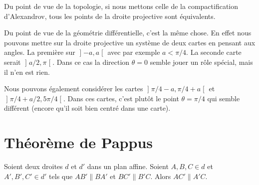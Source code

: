 \begin{remark}
	Du point de vue de la topologie, si nous mettons celle de la compactification d'Alexandrov, tous les points de la droite projective sont équivalents.

	Du point de vue de la géométrie différentielle, c'est la même chose. En effet nous pouvons mettre sur la droite projective un système de deux cartes en pensant aux angles. La première sur \( \mathopen] -a , a \mathclose[\) avec par exemple \( a<\pi/4\). La seconde carte serait \( \mathopen] a/2 , \pi \mathclose[\). Dans ce cas la direction \( \theta=0\) semble jouer un rôle spécial, mais il n'en est rien.

		Nous pouvons également considérer les cartes \( \mathopen] \pi/4-a , \pi/4+a \mathclose[\) et \( \mathopen] \pi/4+a/2 , 5\pi/4 \mathclose[\). Dans ces cartes, c'est plutôt le point \( \theta=\pi/4\) qui semble différent (encore qu'il soit bien centré dans une carte).
\end{remark}


\section{Théorème de Pappus}

\begin{theorem}     
	Soient deux droites \( d\) et \( d'\) dans un plan affine. Soient \( A,B,C\in d\) et \( A',B',C'\in d'\) tels que \( AB'\parallel BA'\) et \( BC'\parallel B'C\). Alors \( AC'\parallel A'C\).
\end{theorem}

